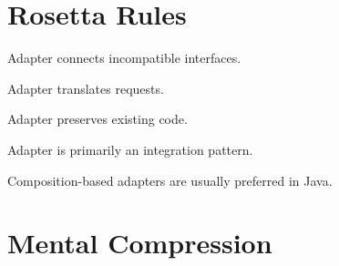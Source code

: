 \documentclass[11pt,a4paper]{book}
\begin{document}
\section{Rosetta Rules}

\begin{rosettarule}

Adapter connects incompatible
interfaces.

\end{rosettarule}


\begin{rosettarule}

Adapter translates requests.

\end{rosettarule}


\begin{rosettarule}

Adapter preserves existing code.

\end{rosettarule}


\begin{rosettarule}

Adapter is primarily an
integration pattern.

\end{rosettarule}


\begin{rosettarule}

Composition-based adapters are
usually preferred in Java.

\end{rosettarule}


\section{Mental Compression}
\end{document}
